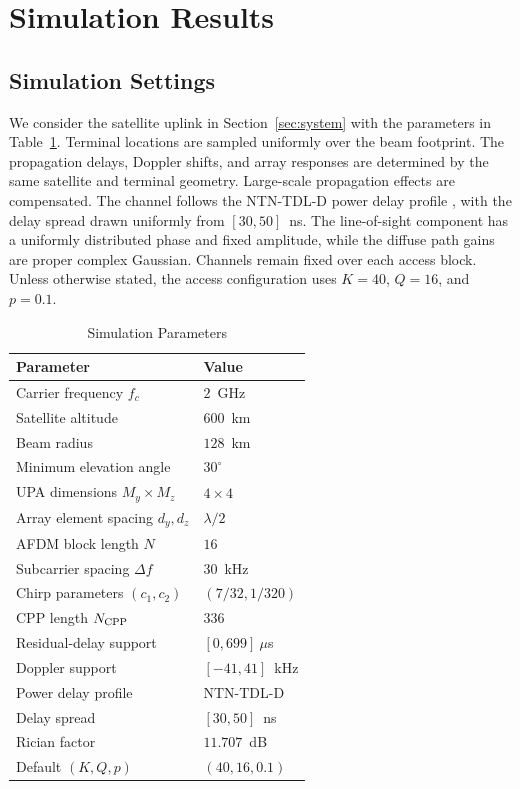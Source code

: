 \section{Simulation Results}
\label{sec:simulations}

\subsection{Simulation Settings}
\label{sec:simulation-settings}

We consider the satellite uplink in Section~\ref{sec:system} with the
parameters in Table~\ref{tab:simulation-parameters}. Terminal locations
are sampled uniformly over the beam footprint. The propagation delays,
Doppler shifts, and array responses are determined by the same satellite
and terminal geometry. Large-scale propagation effects are compensated.
The channel follows the NTN-TDL-D power delay profile \cite{shen2025}, with the delay
spread drawn uniformly from $[30,50]$~ns. The line-of-sight component has
a uniformly distributed phase and fixed amplitude, while the diffuse
path gains are proper complex Gaussian. Channels remain fixed over each
access block. Unless otherwise stated, the access configuration uses
$K=40$, $Q=16$, and $p=0.1$.

\begin{table}[!t]
\caption{Simulation Parameters}
\label{tab:simulation-parameters}
\centering
\small
\begin{tabular}{@{}ll@{}}
\toprule
Parameter & Value \\
\midrule
Carrier frequency $f_c$ & $2$~GHz \\
Satellite altitude & $600$~km \\
Beam radius & $128$~km \\
Minimum elevation angle & $30^\circ$ \\
UPA dimensions $M_y\times M_z$ & $4\times4$ \\
Array element spacing $d_y,d_z$ & $\lambda/2$ \\
AFDM block length $N$ & $16$ \\
Subcarrier spacing $\Delta f$ & $30$~kHz \\
Chirp parameters $(c_1,c_2)$ & $(7/32,1/320)$ \\
CPP length $N_{\rm CPP}$ & $336$ \\
Residual-delay support & $[0,699]~\mu$s \\
Doppler support & $[-41,41]$~kHz \\
Power delay profile & NTN-TDL-D \\
Delay spread & $[30,50]$~ns \\
Rician factor & $11.707$~dB \\
Default $(K,Q,p)$ & $(40,16,0.1)$ \\
\bottomrule
\end{tabular}
\end{table}


